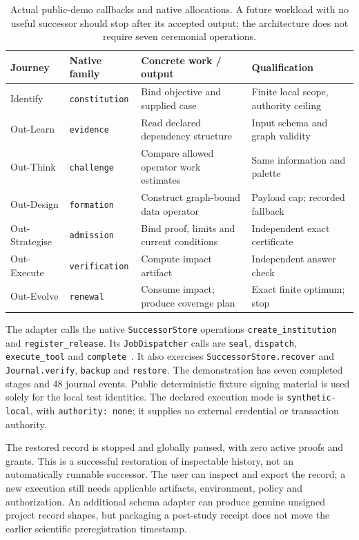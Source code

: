 \begin{table}[htbp]
\centering\small
\begin{tabularx}{\textwidth}{@{}p{.97in}p{.95in}YY@{}}
\toprule
Journey & Native family & Concrete work / output & Qualification \\
\midrule
Identify & \texttt{constitution} & Bind objective and supplied case & Finite local scope, authority ceiling \\
Out-Learn & \texttt{evidence} & Read declared dependency structure & Input schema and graph validity \\
Out-Think & \texttt{challenge} & Compare allowed operator work estimates & Same information and palette \\
Out-Design & \texttt{formation} & Construct graph-bound data operator & Payload cap; recorded fallback \\
Out-Strategise & \texttt{admission} & Bind proof, limits and current conditions & Independent exact certificate \\
Out-Execute & \texttt{verification} & Compute impact artifact & Independent answer check \\
Out-Evolve & \texttt{renewal} & Consume impact; produce coverage plan & Exact finite optimum; stop \\
\bottomrule
\end{tabularx}
\caption{Actual public-demo callbacks and native allocations. A future workload with no useful successor should stop after its accepted output; the architecture does not require seven ceremonial operations.}
\label{tab:stages}
\end{table}

The adapter calls the native \texttt{SuccessorStore} operations \texttt{create\_institution} and \texttt{register\_release}. Its \texttt{JobDispatcher} calls are \texttt{seal}, \texttt{dispatch}, \texttt{execute\_tool} and \texttt{complete}~\cite{montrealai2026successorjobs,montrealai2026successorstate}. It also exercises \texttt{SuccessorStore.recover} and \texttt{Journal.verify}, \texttt{backup} and \texttt{restore}. The demonstration has seven completed stages and 48 journal events. Public deterministic fixture signing material is used solely for the local test identities. The declared execution mode is \texttt{synthetic-local}, with \texttt{authority: none}; it supplies no external credential or transaction authority.

The restored record is stopped and globally paused, with zero active proofs and grants. This is a successful restoration of inspectable history, not an automatically runnable successor. The user can inspect and export the record; a new execution still needs applicable artifacts, environment, policy and authorization. An additional schema adapter can produce genuine unsigned project record shapes, but packaging a post-study receipt does not move the earlier scientific preregistration timestamp.

